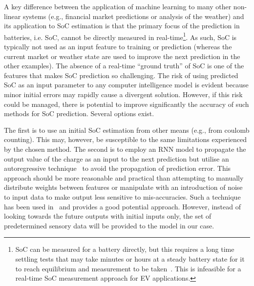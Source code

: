 %
%
A key difference between the application of machine learning to many other non-linear systems (e.g., financial market predictions or analysis of the weather) and its application to SoC estimation is that the primary focus of the prediction in batteries, i.e. SoC, cannot be directly measured in real-time\footnote{SoC can be measured for a battery directly, but this requires a long time settling tests that may take minutes or hours at a steady battery state for it to reach equilibrium and measurement to be taken~\cite{ali_towards_2019}. This is infeasible for a real-time SoC measurement approach for EV applications.}.
As such, SoC is typically not used as an input feature to training or prediction (whereas the current market or weather state are used to improve the next prediction in the other examples).
The absence of a real-time “ground truth” of SoC is one of the features that makes SoC prediction so challenging. %
The risk of using predicted SoC as an input parameter to any computer intelligence model is evident because minor initial errors may rapidly cause a divergent solution.
However, if this risk could be managed, there is potential to improve significantly the accuracy of such methods for SoC prediction.
Several options exist.

%
%
The first is to use an initial SoC estimation from other means (e.g., from coulomb counting).
This may, however, be susceptible to the same limitations experienced by the chosen method.
The second is to employ an RNN model to propagate the output value of the charge as an input to the next prediction but utilise an autoregressive technique~\cite{time_2020} to avoid the propagation of prediction error.
This approach should be more reasonable and practical than attempting to manually distribute weights between features or manipulate with an introduction of noise to input data to make output less sensitive to mis-accuracies.
Such a technique has been used in~\cite{time_2020} and provides a good potential approach.
However, instead of looking towards the future outputs with initial inputs only, the set of predetermined sensory data will be provided to the model in our case.


